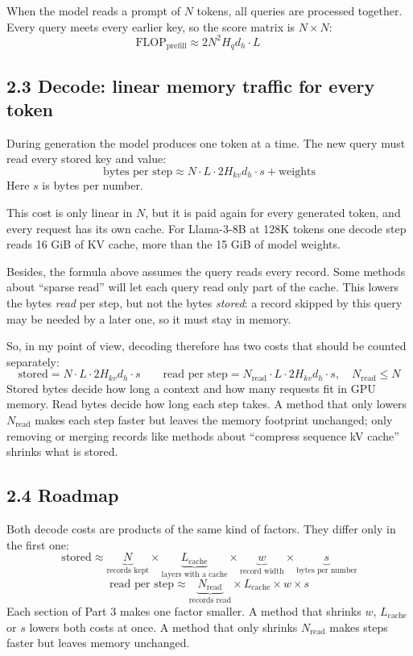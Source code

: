 \documentclass[11pt]{article}
\begin{document}
When the model reads a prompt of \(N\) tokens, all queries are processed together. Every query meets every earlier key, so the score matrix is \(N\times N\):
\[
\text{FLOP}_{\text{prefill}}\approx 2N^2H_qd_h\cdot L \qquad
\]

\subsection{2.3 Decode: linear memory traffic for every token}

During generation the model produces one token at a time. The new query must read every stored key and value:
\[
\text{bytes per step}\approx N\cdot L\cdot 2H_{kv}d_h\cdot s + \text{weights}
\]
Here \(s\) is bytes per number.

This cost is only linear in \(N\), but it is paid again for every generated token, and every request has its own cache. For Llama-3-8B at 128K tokens one decode step reads 16 GiB of KV cache, more than the 15 GiB of model weights.

Besides, the formula above assumes the query reads every record. Some methods about ``sparse read'' will let each query read only part of the cache. This lowers the bytes \emph{read} per step, but not the bytes \emph{stored}: a record skipped by this query may be needed by a later one, so it must stay in memory.

So, in my point of view, decoding therefore has two costs that should be counted separately:
\[
\text{stored}=N\cdot L\cdot 2H_{kv}d_h\cdot s
\qquad
\text{read per step}=N_{\text{read}}\cdot L\cdot 2H_{kv}d_h\cdot s,\quad N_{\text{read}}\le N
\]
Stored bytes decide how long a context and how many requests fit in GPU memory. Read bytes decide how long each step takes. A method that only lowers \(N_{\text{read}}\) makes each step faster but leaves the memory footprint unchanged; only removing or merging records like methods about ``compress sequence kV cache'' shrinks what is stored.

\subsection{2.4 Roadmap}

Both decode costs are products of the same kind of factors. They differ only in the first one:
\[
\text{stored}\approx \underbrace{N}_{\text{records kept}}\times\underbrace{L_{\text{cache}}}_{\text{layers with a cache}}\times\underbrace{w}_{\text{record width}}\times\underbrace{s}_{\text{bytes per number}}
\]
\[
\text{read per step}\approx \underbrace{N_{\text{read}}}_{\text{records read}}\times L_{\text{cache}}\times w\times s
\]
Each section of Part 3 makes one factor smaller. A method that shrinks \(w\), \(L_{\text{cache}}\) or \(s\) lowers both costs at once. A method that only shrinks \(N_{\text{read}}\) makes steps faster but leaves memory unchanged.
\end{document}
